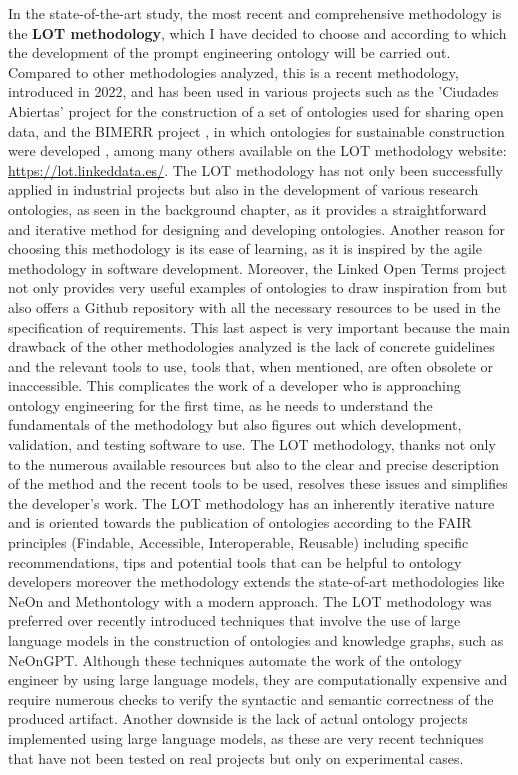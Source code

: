 In the state-of-the-art study, the most recent and comprehensive methodology is the \textbf{LOT methodology}, which I have decided to choose and according to which the development of the prompt engineering ontology will be carried out. Compared to other methodologies analyzed, this is a recent methodology, introduced in 2022, and has been used in various projects such as the 'Ciudades Abiertas' project \cite{ciudad} for the construction of a set of ontologies used for sharing open data, and the BIMERR project \cite{bimerr}, in which ontologies for sustainable construction were developed \cite{bountouni2021bimerr}, among many others available on the LOT methodology website: \href{https://lot.linkeddata.es/}{https://lot.linkeddata.es/}. The LOT methodology has not only been successfully applied in industrial projects but also in the development of various research ontologies, as seen in the background chapter, as it provides a straightforward and iterative method for designing and developing ontologies. Another reason for choosing this methodology is its ease of learning, as it is inspired by the agile methodology in software development. Moreover, the Linked Open Terms project not only provides very useful examples of ontologies to draw inspiration from but also offers a Github repository \cite{lot_github} with all the necessary resources to be used in the specification of requirements. This last aspect is very important because the main drawback of the other methodologies analyzed is the lack of concrete guidelines and the relevant tools to use, tools that, when mentioned, are often obsolete or inaccessible. This complicates the work of a developer who is approaching ontology engineering for the first time, as he needs to understand the fundamentals of the methodology but also figures out which development, validation, and testing software to use. The LOT methodology, thanks not only to the numerous available resources but also to the clear and precise description of the method and the recent tools to be used, resolves these issues and simplifies the developer's work. The LOT methodology has an inherently iterative nature and is oriented towards the publication of ontologies according to the FAIR principles \cite{fair_eu} (Findable, Accessible, Interoperable, Reusable) including specific recommendations, tips and potential
tools that can be helpful to ontology developers moreover the methodology extends the state-of-art methodologies like NeOn and Methontology with a modern approach.
The LOT methodology was preferred over recently introduced techniques that involve the use of large language models in the construction of ontologies and knowledge graphs, such as NeOnGPT. Although these techniques automate the work of the ontology engineer by using large language models, they are computationally expensive and require numerous checks to verify the syntactic and semantic correctness of the produced artifact. Another downside is the lack of actual ontology projects implemented using large language models, as these are very recent techniques that have not been tested on real projects but only on experimental cases.\\
